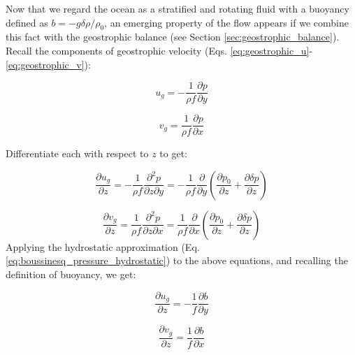 \documentclass[12pt]{article}
\numberwithin{equation}{section}
\numberwithin{figure}{section}
\numberwithin{table}{section}
\begin{document}
Now that we regard the ocean as a stratified and rotating fluid with a buoyancy
defined as $b = - g \delta \rho / \rho_0$, an emerging property of the flow
appears if we combine this fact with the geostrophic balance
(see Section \ref{sec:geostrophic_balance}).
Recall the components of geostrophic velocity (Eqs. \ref{eq:geostrophic_u}-\ref{eq:geostrophic_v}):

\begin{equation}
  u_g = - \frac{1}{\rho f} \frac{\partial p}{\partial y}
  \label{eq:geostrophic_u}
\end{equation}

\begin{equation}
  v_g = \frac{1}{\rho f} \frac{\partial p}{\partial x}
  \label{eq:geostrophic_v}
\end{equation}

Differentiate each with respect to $z$ to get:

\begin{equation}
  \frac{\partial u_g}{\partial z} =
  - \frac{1}{\rho f} \frac{\partial^2 p}{\partial z \partial y} =
  - \frac{1}{\rho f} \frac{\partial}{\partial y} \left( \frac{\partial p_0}{\partial z} + \frac{\partial \delta p}{\partial z} \right)
\end{equation}

\begin{equation}
  \frac{\partial v_g}{\partial z} =
  \frac{1}{\rho f} \frac{\partial^2 p}{\partial z \partial x} =
  \frac{1}{\rho f} \frac{\partial}{\partial x} \left( \frac{\partial p_0}{\partial z} + \frac{\partial \delta p}{\partial z} \right)
\end{equation}
Applying the hydrostatic approximation (Eq. \ref{eq:boussinesq_pressure_hydrostatic})
to the above equations, and recalling the definition of buoyancy, we get:

\begin{equation}
  \frac{\partial u_g}{\partial z} =
  - \frac{1}{f} \frac{\partial b}{\partial y}
  \label{eq:thermal_wind_u}
\end{equation}

\begin{equation}
  \frac{\partial v_g}{\partial z} =
  \frac{1}{f} \frac{\partial b}{\partial x}
  \label{eq:thermal_wind_v}
\end{equation}
\end{document}
